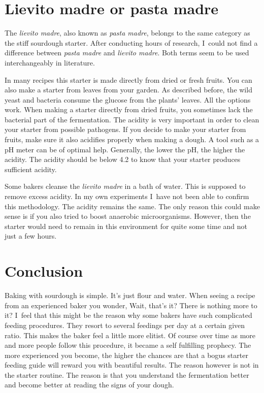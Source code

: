 \section{Lievito madre or pasta madre}

The \emph{lievito madre}, also known as \emph{pasta madre}, belongs to the
same category as the stiff sourdough starter. After conducting hours of
research, I~could not find a difference between \emph{pasta madre} and
\emph{lievito madre}. Both terms seem to be used interchangeably in
literature.

In many recipes this starter is made directly
from dried or fresh fruits. You can also make a starter from leaves from your
garden. As described before, the wild yeast and bacteria consume the glucose
from the plants' leaves. All the options work. When making a starter directly
from dried fruits, you sometimes lack the bacterial part of the fermentation.
The acidity is very important in order to clean your starter from possible
pathogens. If you decide to make your starter from fruits, make sure it also
acidifies properly when making a dough. A tool such as a pH meter can be of
optimal help. Generally, the lower the pH, the higher the acidity. The acidity
should be below 4.2 to know that your starter produces sufficient acidity.

Some bakers cleanse the \emph{lievito madre} in a bath of water. This is supposed to
remove excess acidity. In my own experiments I~have not been able to confirm
this methodology. The acidity remains the same. The only reason this could
make sense is if you also tried to boost anaerobic microorganisms. However, then the
starter would need to remain in this environment for quite some time and not just
a few hours.

\section{Conclusion}%
\label{sec:starter-type-conclusion}
Baking with sourdough is simple. It's just flour and water. When seeing a recipe
from an experienced baker you wonder, Wait, that's it? There is nothing more
to it? I~feel that this might be the reason why some bakers have such complicated
feeding procedures. They resort to several feedings per day at a certain given ratio.
This makes the baker feel a little more elitist. Of course over time as
more and more people follow this procedure, it became a self fulfilling prophecy.
The more experienced you become, the higher the chances are that a bogus starter
feeding guide will reward you with beautiful results. The reason however is
not in the starter routine. The reason is that you understand the fermentation better
and become better at reading the signs of your dough.

